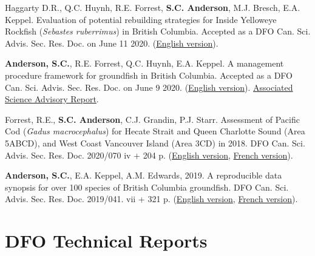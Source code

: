 \begin{description}
\tightlist
\item[2020]
Haggarty D.R., Q.C. Huynh, R.E. Forrest, \textbf{S.C. Anderson}, M.J.
Bresch, E.A. Keppel. Evaluation of potential rebuilding strategies for
Inside Yelloweye Rockﬁsh (\emph{Sebastes ruberrimus}) in British
Columbia. Accepted as a DFO Can. Sci. Advis. Sec. Res. Doc. on June 11
2020.
(\href{https://www.dropbox.com/s/pll8axzsxqka8j8/resdoc-iye.pdf?dl=1}{English
version}).
\item[2020]
\textbf{Anderson, S.C.}, R.E. Forrest, Q.C. Huynh, E.A. Keppel. A
management procedure framework for groundﬁsh in British Columbia.
Accepted as a DFO Can. Sci. Advis. Sec. Res. Doc. on June 9 2020.
(\href{https://www.dropbox.com/s/rgxk2wco5v5zp0e/gfmp-2020-03-13.pdf?dl=1}{English
version}).
\href{https://www.dfo-mpo.gc.ca/csas-sccs/Publications/SAR-AS/2021/2021_002-eng.html}{Associated
Science Advisory Report}.
\item[2020]
Forrest, R.E., \textbf{S.C. Anderson}, C.J. Grandin, P.J. Starr.
Assessment of Pacific Cod (\emph{Gadus macrocephalus}) for Hecate Strait
and Queen Charlotte Sound (Area 5ABCD), and West Coast Vancouver Island
(Area 3CD) in 2018. DFO Can. Sci. Advis. Sec. Res. Doc. 2020/070 iv +
204 p.
(\href{https://www.dfo-mpo.gc.ca/csas-sccs/Publications/ResDocs-DocRech/2020/2020_070-eng.html}{English
version},
\href{https://www.dfo-mpo.gc.ca/csas-sccs/Publications/ResDocs-DocRech/2020/2020_070-fra.html}{French
version}).
\item[2019]
\textbf{Anderson, S.C.}, E.A. Keppel, A.M. Edwards, 2019. A reproducible
data synopsis for over 100 species of British Columbia groundfish. DFO
Can. Sci. Advis. Sec. Res. Doc. 2019/041. vii + 321 p.
(\href{http://www.dfo-mpo.gc.ca/csas-sccs/Publications/ResDocs-DocRech/2019/2019_041-eng.html}{English
version},
\href{http://www.dfo-mpo.gc.ca/csas-sccs/Publications/ResDocs-DocRech/2019/2019_041-fra.html}{French
version}).
\end{description}

\hypertarget{dfo-technical-reports}{%
\section{DFO Technical Reports}\label{dfo-technical-reports}}

